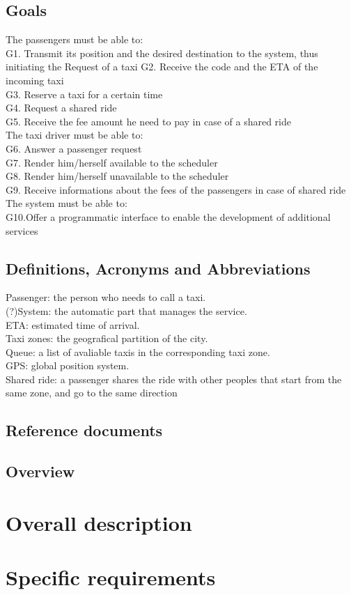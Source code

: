 \documentclass[a4paper,11pt]{report}
\begin{document}
\section{Goals}
The passengers must be able to:\\
 G1. Transmit its position and the desired destination to the system, thus initiating the Request of a taxi
    G2. Receive the code and the ETA of the incoming taxi\\
    G3. Reserve a taxi for a certain time\\
    G4. Request a shared ride\\
    G5. Receive the fee amount he need to pay in case of a shared ride\\
The taxi driver must be able to:\\
    G6. Answer a passenger request\\
    G7. Render him/herself available to the scheduler\\
    G8. Render him/herself unavailable to the scheduler\\
    G9. Receive informations about the fees of the passengers in case of shared ride\\
The system must be able to:\\
   G10.Offer a programmatic interface to enable the development of additional services\\
 
\section{Definitions, Acronyms and Abbreviations}
Passenger: the person who needs to call a taxi.\\
(?)System: the automatic part that manages the service.\\
ETA: estimated time of arrival.\\
Taxi zones: the geografical partition of the city.\\
Queue: a list of avaliable taxis in the corresponding taxi zone.\\
GPS: global position system.\\
Shared ride: a passenger shares the ride with other peoples that start from the same zone, and go to the same direction\\

 
\section{Reference documents}

\section{Overview}


\chapter*{Overall description}
\addtocounter{chapter}{1}


\chapter*{Specific requirements}
\addtocounter{chapter}{1}
\end{document}
